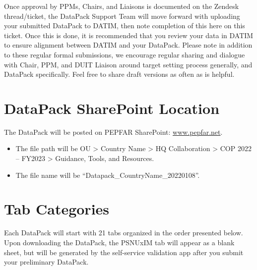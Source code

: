 \documentclass[
  openany]{book}
\begin{document}
Once approval by PPMs, Chairs, and Liaisons is documented on the Zendesk
thread/ticket, the DataPack Support Team will move forward with
uploading your submitted DataPack to DATIM, then note completion of this
here on this ticket. Once this is done, it is recommended that you
review your data in DATIM to ensure alignment between DATIM and your
DataPack. Please note in addition to these regular formal submissions,
we encourage regular sharing and dialogue with Chair, PPM, and DUIT
Liaison around target setting process generally, and DataPack
specifically. Feel free to share draft versions as often as is helpful.

\hypertarget{datapack-sharepoint-location}{%
\section{DataPack SharePoint Location}\label{datapack-sharepoint-location}}

The DataPack will be posted on PEPFAR SharePoint:
\href{http://www.pepfar.net}{www.pepfar.net}.

\begin{itemize}
\item
  The file path will be OU \textgreater{} Country Name \textgreater{} HQ Collaboration \textgreater{} COP
  2022 -- FY2023 \textgreater{} Guidance, Tools, and Resources.
\item
  The file name will be ``Datapack\_CountryName\_20220108''.
\end{itemize}

\hypertarget{tab-categories}{%
\section{Tab Categories}\label{tab-categories}}

Each DataPack will start with 21 tabs organized in the order presented
below. Upon downloading the DataPack, the PSNUxIM tab will appear as a
blank sheet, but will be generated by the self-service validation app
after you submit your preliminary DataPack.
\end{document}
